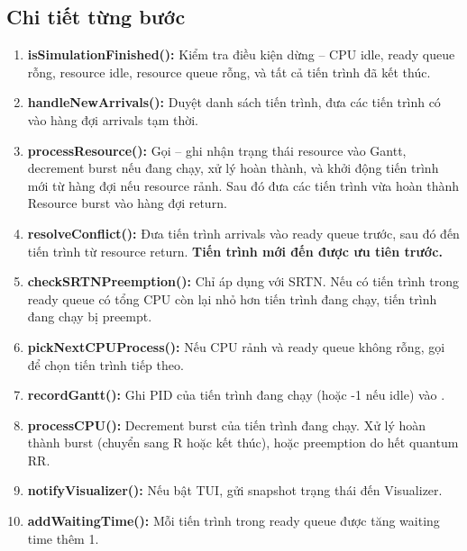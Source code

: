 \subsection{Chi tiết từng bước}

\begin{enumerate}
    \item \textbf{isSimulationFinished():} Kiểm tra điều kiện dừng -- CPU idle, ready queue rỗng, resource idle, resource queue rỗng, và tất cả tiến trình đã kết thúc.
    
    \item \textbf{handleNewArrivals():} Duyệt danh sách tiến trình, đưa các tiến trình có\\   vào hàng đợi arrivals tạm thời.
    
    \item \textbf{processResource():} Gọi  -- ghi nhận trạng thái resource vào Gantt, decrement burst nếu đang chạy, xử lý hoàn thành, và khởi động tiến trình mới từ hàng đợi nếu resource rảnh. Sau đó đưa các tiến trình vừa hoàn thành Resource burst vào hàng đợi return.
    
    \item \textbf{resolveConflict():} Đưa tiến trình arrivals vào ready queue trước, sau đó đến tiến trình từ resource return. \textbf{Tiến trình mới đến được ưu tiên trước.}
    
    \item \textbf{checkSRTNPreemption():} Chỉ áp dụng với SRTN. Nếu có tiến trình trong ready queue có tổng CPU còn lại nhỏ hơn tiến trình đang chạy, tiến trình đang chạy bị preempt.
    
    \item \textbf{pickNextCPUProcess():} Nếu CPU rảnh và ready queue không rỗng, gọi\\   để chọn tiến trình tiếp theo.
    
    \item \textbf{recordGantt():} Ghi PID của tiến trình đang chạy (hoặc -1 nếu idle) vào .
    
    \item \textbf{processCPU():} Decrement burst của tiến trình đang chạy. Xử lý hoàn thành burst (chuyển sang R hoặc kết thúc), hoặc preemption do hết quantum RR.
    
    \item \textbf{notifyVisualizer():} Nếu bật TUI, gửi snapshot trạng thái đến Visualizer.
    
    \item \textbf{addWaitingTime():} Mỗi tiến trình trong ready queue được tăng waiting time thêm 1.
\end{enumerate}

